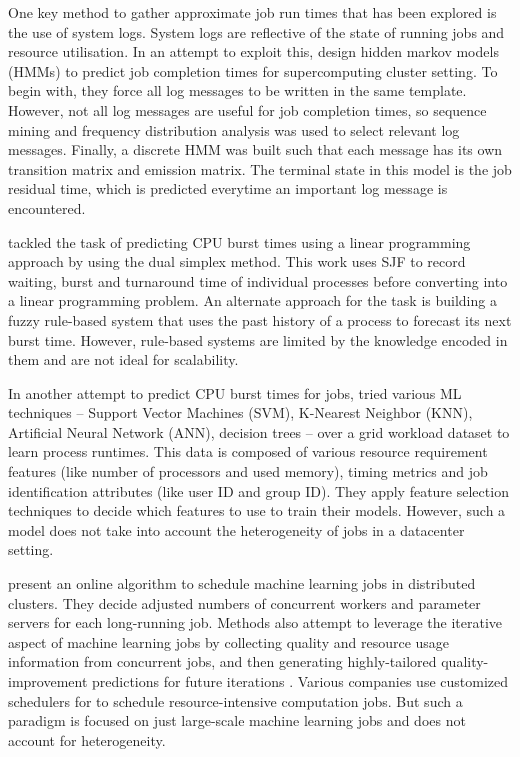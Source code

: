 \documentclass{hotnets19}
\begin{document}
One key method to gather approximate job run times that has been explored is the use of system logs. System logs are reflective of the state of running jobs and resource utilisation.
In an attempt to exploit this, \cite{predictjobcompletion} design hidden markov models (HMMs) to predict job completion times for supercomputing cluster setting.
To begin with, they force all log messages to be written in the same template.
However, not all log messages are useful for job completion times, so sequence mining and frequency distribution analysis was used to select relevant log messages.
Finally, a discrete HMM was built such that each message has its own transition matrix and emission matrix.
The terminal state in this model is the job residual time, which is predicted everytime an important log message is encountered.

\cite{dualsimplex} tackled the task of predicting CPU burst times using a linear programming approach by using the dual simplex method.
This work uses SJF to record waiting, burst and turnaround time of individual processes before converting into a linear programming problem.
An alternate approach for the task is building a fuzzy rule-based system that uses the past history of a process to forecast its next burst time.
However, rule-based systems are limited by the knowledge encoded in them and are not ideal for scalability.

In another attempt to predict CPU burst times for jobs, \cite{helmy2015machine}  tried various ML techniques -- Support Vector Machines (SVM), K-Nearest Neighbor (KNN), Artificial Neural Network (ANN), decision trees -- over a grid workload dataset to learn process runtimes.
This data is composed of various resource requirement features (like number of processors and used memory), timing metrics and job identification attributes (like user ID and group ID).
They apply feature selection techniques to decide which features to use to train their models.
However, such a model does not take into account the heterogeneity of jobs in a datacenter setting.

\cite{onlinescheduling} present an online algorithm to schedule machine learning jobs in distributed clusters.
They decide adjusted numbers of concurrent workers and parameter servers for each long-running job.
Methods also attempt to leverage the iterative aspect of machine learning jobs by collecting quality and resource usage information from concurrent jobs, and then generating highly-tailored quality-improvement predictions for future iterations \cite{slaq}.
Various companies use customized schedulers for to schedule resource-intensive computation jobs.
But such a paradigm is focused on just large-scale machine learning jobs and does not account for heterogeneity.
\end{document}
